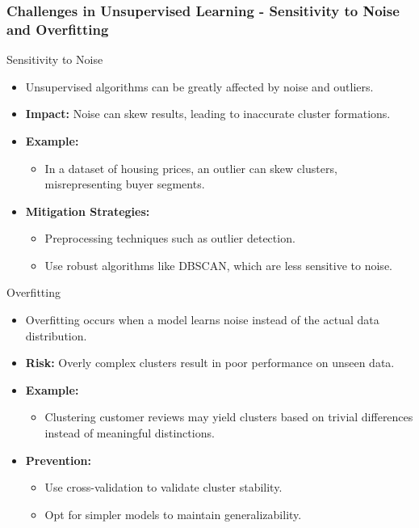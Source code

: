 \documentclass[aspectratio=169]{beamer}
\begin{document}
\begin{frame}[fragile]
    \frametitle{Challenges in Unsupervised Learning - Sensitivity to Noise and Overfitting}
    \begin{block}{Sensitivity to Noise}
        \begin{itemize}
            \item Unsupervised algorithms can be greatly affected by noise and outliers.
            \item \textbf{Impact:} Noise can skew results, leading to inaccurate cluster formations.
            \item \textbf{Example:}
                \begin{itemize}
                    \item In a dataset of housing prices, an outlier can skew clusters, misrepresenting buyer segments.
                \end{itemize}
            \item \textbf{Mitigation Strategies:}
                \begin{itemize}
                    \item Preprocessing techniques such as outlier detection.
                    \item Use robust algorithms like DBSCAN, which are less sensitive to noise.
                \end{itemize}
        \end{itemize}
    \end{block}
    
    \begin{block}{Overfitting}
        \begin{itemize}
            \item Overfitting occurs when a model learns noise instead of the actual data distribution.
            \item \textbf{Risk:} Overly complex clusters result in poor performance on unseen data.
            \item \textbf{Example:}
                \begin{itemize}
                    \item Clustering customer reviews may yield clusters based on trivial differences instead of meaningful distinctions.
                \end{itemize}
            \item \textbf{Prevention:}
                \begin{itemize}
                    \item Use cross-validation to validate cluster stability.
                    \item Opt for simpler models to maintain generalizability.
                \end{itemize}
        \end{itemize}
    \end{block}
\end{frame}
\end{document}
